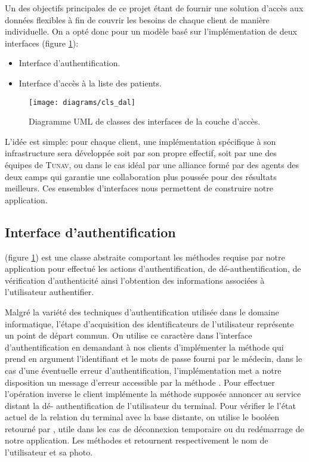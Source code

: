 Un des objectifs principales de ce projet étant de fournir une solution
d’accès aux données flexibles à fin de couvrir les besoins de chaque
client de manière individuelle. On a opté donc pour un modèle basé sur
l’implémentation de deux interfaces (figure \ref{fig:cls_dal}):

\begin{itemize}
\item Interface d'authentification.
\item Interface d’accès à la liste des patients.
\end{itemize}

\begin{figure}
\center
\texttt{[image: diagrams/cls\_dal]}
\caption{Diagramme UML de classes des interfaces de la couche d’accès.}
\label{fig:cls_dal}
\end{figure}

L'idée est simple: pour chaque client, une implémentation spécifique à son infrastructure sera développée soit par son propre effectif, soit par une des équipes de \textsc{Tunav}, ou dans le cas idéal par une alliance formé par des agents des deux camps qui garantie une collaboration plus poussée pour des résultats meilleurs.
Ces ensembles d'interfaces nous permettent de construire notre application.

\subsection{Interface d'authentification}

 (figure
\ref{fig:cls_dal}) est une classe abstraite comportant les méthodes
requise par notre application pour effectué les actions
d'authentification, de dé-authentification, de vérification
d'authenticité ainsi l'obtention des informations associées à l'utilisateur
authentifier.

Malgré la variété des techniques d'authentification utilisée dans le domaine
informatique, l'étape d'acquisition des identificateurs de l'utilisateur
représente un point de départ commun. On utilise ce caractère dans l'interface
d'authentification en demandant à nos clients d'implémenter la méthode
 qui prend en argument l'identifiant et le mots de passe fourni par
le médecin, dans le cas d'une éventuelle erreur d'authentification,
l’implémentation met a notre disposition un message d'erreur accessible par la
méthode . Pour effectuer l’opération inverse le client
implémente la méthode  supposée annoncer au service distant la dé-
authentification de l'utilisateur du terminal. Pour vérifier le l'état actuel de
la relation du terminal avec la base distante, on utilise le booléen retourné
par , utile dans les cas de déconnexion temporaire ou du
redémarrage de notre application. Les méthodes  et
 retournent respectivement le nom de l'utilisateur et sa photo.

